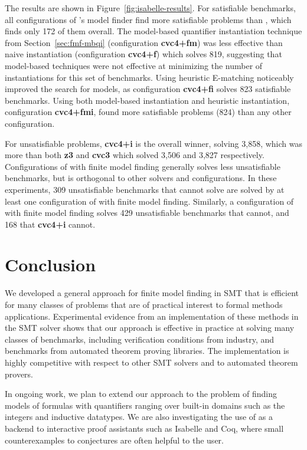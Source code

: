 \documentclass{svjour3}                     %
\begin{document}
The results are shown in Figure~\ref{fig:isabelle-results}.
For satisfiable benchmarks, all configurations of \cvc's model finder find more satisfiable 
problems than \ziii, which finds only 172 of them overall.
The model-based quantifier instantiation technique from Section~\ref{sec:fmf-mbqi} (configuration {\bf cvc4+fm})
was less effective than naive instantiation (configuration {\bf cvc4+f}) which solves 819,
suggesting that model-based techniques were not effective at minimizing the number of instantiations for this set of benchmarks.
Using heuristic E-matching noticeably improved the search for models, 
as configuration {\bf cvc4+fi} solves 823 satisfiable benchmarks.
Using both model-based instantiation and heuristic instantiation, configuration {\bf cvc4+fmi},
found more satisfiable problems (824) than any other configuration.

For unsatisfiable problems, {\bf cvc4+i} is the overall winner, solving 3,858,
which was more than both {\bf z3 } and {\bf cvc3} which solved 3,506 and 3,827 respectively.
Configurations of \cvc with finite model finding generally solves less unsatisfiable benchmarks,
but is orthogonal to other solvers and configurations.
In these experiments, 309 unsatisfiable benchmarks that \cvciii cannot solve are solved by at least one configuration of \cvc with finite model finding.
Similarly, a configuration of \cvc with finite model finding solves 429 unsatisfiable benchmarks that \ziii cannot, and 168 that {\bf cvc4+i} cannot.

\section{Conclusion}
\label{sec:conclusion}

We developed a general approach for finite model finding in SMT that 
is efficient for many classes of problems that are of practical interest to formal methods applications.
Experimental evidence from an implementation of these methods in the SMT solver \cvc
shows that our approach is effective in practice at solving many classes of benchmarks, 
including verification conditions from industry,
and benchmarks from automated theorem proving libraries.
The implementation is highly competitive  with respect to other SMT solvers and
to automated theorem provers.

In ongoing work, 
we plan to extend our approach to the problem of finding models of formulas 
with quantifiers ranging over built-in domains such as the integers and inductive datatypes.
We are also investigating the use of \cvc as a backend to interactive proof assistants
such as Isabelle and Coq, 
where small counterexamples to conjectures are often helpful to the user.
\end{document}
